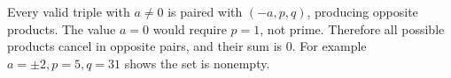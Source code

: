Every valid triple with $a\ne0$ is paired with $(-a,p,q)$, producing opposite products. The value $a=0$ would require $p=1$, not prime. Therefore all possible products cancel in opposite pairs, and their sum is $\boxed0$. For example $a=\pm2,p=5,q=31$ shows the set is nonempty.
